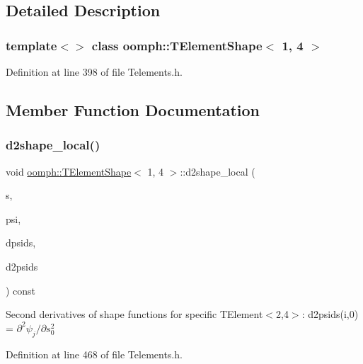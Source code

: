 \subsection{Detailed Description}
\subsubsection*{template$<$$>$\newline
class oomph\+::\+T\+Element\+Shape$<$ 1, 4 $>$}



Definition at line 398 of file Telements.\+h.



\subsection{Member Function Documentation}
\mbox{\label{classoomph_1_1TElementShape_3_011_00_014_01_4_ac99262361ef4652bd2da1b7a6758c935}} 
\subsubsection{\texorpdfstring{d2shape\+\_\+local()}{d2shape\_local()}}
{\footnotesize\ttfamily void \hyperlink{classoomph_1_1TElementShape}{oomph\+::\+T\+Element\+Shape}$<$ 1, 4 $>$\+::d2shape\+\_\+local (\begin{DoxyParamCaption}\item[{const \hyperlink{classoomph_1_1Vector}{Vector}$<$ double $>$ \&}]{s,  }\item[{\hyperlink{classoomph_1_1Shape}{Shape} \&}]{psi,  }\item[{\hyperlink{classoomph_1_1DShape}{D\+Shape} \&}]{dpsids,  }\item[{\hyperlink{classoomph_1_1DShape}{D\+Shape} \&}]{d2psids }\end{DoxyParamCaption}) const\hspace{0.3cm}{\ttfamily [inline]}}

Second derivatives of shape functions for specific T\+Element$<$2,4$>$\+: d2psids(i,0) = $ \partial^2 \psi_j / \partial s_0^2 $ 

Definition at line 468 of file Telements.\+h.

